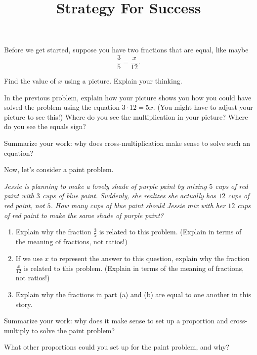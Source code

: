 \documentclass[handout,nooutcomes, noauthor]{ximera}
\title{Strategy For Success}
\begin{document}
\begin{abstract}
\end{abstract}
\maketitle

\begin{question}
    Before we get started, suppose you have two fractions that are equal, like maybe 
    \[
    \frac{3}{5} = \frac{x}{12}.
    \]
    
    Find the value of $x$ using a picture. Explain your thinking. \vfill
\end{question}

\begin{question}
    In the previous problem, explain how your picture shows you how you could have solved the problem using the equation $3\cdot 12 = 5 x$. (You might have to adjust your picture to see this!) Where do you see the multiplication in your picture? Where do you see the equals sign? \vfill
\end{question}

\begin{question}
    Summarize your work: why does cross-multiplication make sense to solve such an equation? \vfill
\end{question}

\newpage
\begin{problem}
Now, let's consider a paint problem.

{\em Jessie is planning to make a lovely shade of purple paint by mixing $5 $ cups of red paint with $3$ cups of blue paint. Suddenly, she realizes she actually has $12$ cups of red paint, not $5$. How many cups of blue paint should Jessie mix with her $12$ cups of red paint to make the same shade of purple paint?}

\begin{enumerate}
    \item Explain why the fraction $\frac{3}{5}$ is related to this problem. (Explain in terms of the meaning of fractions, not ratios!) \vfill
    \item If we use $x$ to represent the answer to this question, explain why the fraction $\frac{x}{12}$ is related to this problem. (Explain in terms of the meaning of fractions, not ratios!) \vfill
    \item Explain why the fractions in part (a) and (b) are equal to one another in this story.\vfill
\end{enumerate}
\end{problem}


\begin{question}
    
Summarize your work: why does it make sense to set up a proportion and cross-multiply to solve the paint problem? \vfill
\end{question}

\begin{question}
    What other proportions could you set up for the paint problem, and why? \vfill
\end{question}
\end{document}
